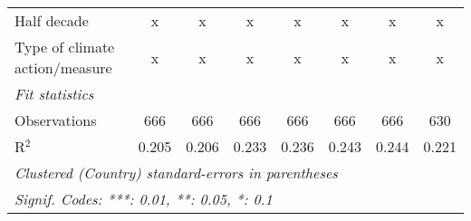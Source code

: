 \begin{table}[htbp]
\begin{tabular}{lccccccc}
      Half decade                                                               & x            & x            & x              & x              & x              & x              & x\\  
      Type of climate action/measure                                            & x            & x            & x              & x              & x              & x              & x\\  
      \midrule \emph{Fit statistics}\\
      Observations                                                              & 666          & 666          & 666            & 666            & 666            & 666            & 630\\  
      R$^2$                                                                     & 0.205        & 0.206        & 0.233          & 0.236          & 0.243          & 0.244          & 0.221\\  
      \midrule
      \multicolumn{8}{l}{\emph{Clustered (Country) standard-errors in parentheses}}\\
      \multicolumn{8}{l}{\emph{Signif. Codes: ***: 0.01, **: 0.05, *: 0.1}}\\
   \end{tabular}
\end{table}


